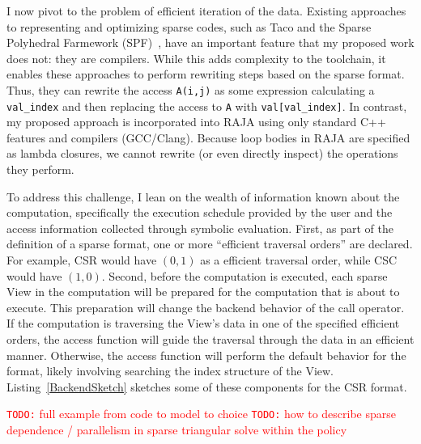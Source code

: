 \documentclass{article}
\newcommand{\todo}[1]{{\textcolor{red}{{\tt{TODO:}}\,\,#1 }}}
\begin{document}
I now pivot to the problem of efficient iteration of the data.
Existing approaches to representing and optimizing sparse codes, such as Taco and the Sparse Polyhedral Farmework (SPF)~\cite{strout2016approach}, have an important feature that my proposed work does not: they are compilers.
While this adds complexity to the toolchain, it enables these approaches to perform rewriting steps based on the sparse format.
Thus, they can rewrite the access \verb.A(i,j). as some expression calculating a \verb.val_index. and then replacing the access to \verb.A. with \verb.val[val_index]..
In contrast, my proposed approach is incorporated into RAJA using only standard C++ features and compilers (GCC/Clang).
Because loop bodies in RAJA are specified as lambda closures, we cannot rewrite (or even directly inspect) the operations they perform.

To address this challenge, I lean on the wealth of information known about the computation, specifically the execution schedule provided by the user and the access information collected through symbolic evaluation. 
First, as part of the definition of a sparse format, one or more \enquote{efficient traversal orders} are declared. 
For example, CSR would have $(0,1)$ as a efficient traversal order, while CSC would have $(1,0)$.
Second, before the computation is executed, each sparse View in the computation will be prepared for the computation that is about to execute.
This preparation will change the backend behavior of the call operator.
If the computation is traversing the View's data in one of the specified efficient orders, the access function will guide the traversal through the data in an efficient manner.
Otherwise, the access function will perform the default behavior for the format, likely involving searching the index structure of the View.
Listing~\ref{BackendSketch} sketches some of these components for the CSR format. 


\todo{full example from code to model to choice}
\todo{how to describe sparse dependence / parallelism in sparse triangular solve within the policy}
\end{document}
